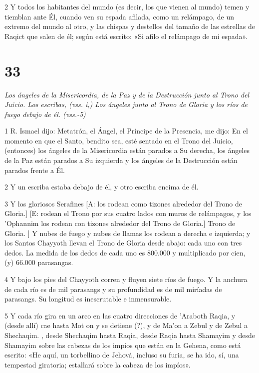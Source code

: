 \par 2 Y todos los habitantes del mundo (es decir, los que vienen al mundo) temen y tiemblan ante Él, cuando ven su espada afilada, como un relámpago, de un extremo del mundo al otro, y las chispas y destellos del tamaño de las estrellas de Raqict que salen de él; según está escrito: «Si afilo el relámpago de mi espada».


\chapter{33}

\par \textit{Los ángeles de la Misericordia, de la Paz y de la Destrucción junto al Trono del Juicio. Los escribas, (vss. i,) Los ángeles junto al Trono de Gloria y los ríos de fuego debajo de él. (vss.-5)}

\par 1 R. Ismael dijo: Metatrón, el Ángel, el Príncipe de la Presencia, me dijo: En el momento en que el Santo, bendito sea, esté sentado en el Trono del Juicio, (entonces) los ángeles de la Misericordia están parados a Su derecha, los ángeles de la Paz están parados a Su izquierda y los ángeles de la Destrucción están parados frente a Él.

\par 2 Y un escriba estaba debajo de él, y otro escriba encima de él.

\par 3 Y los gloriosos Serafines [A: los rodean como tizones alrededor del Trono de Gloria.] [E: rodean el Trono por sus cuatro lados con muros de relámpagos, y los 'Ophannim los rodean con tizones alrededor del Trono de Gloria.] Trono de Gloria. ] Y nubes de fuego y nubes de llamas los rodean a derecha e izquierda; y los Santos Chayyoth llevan el Trono de Gloria desde abajo: cada uno con tres dedos. La medida de los dedos de cada uno es 800.000 y multiplicado por cien, (y) 66.000 parasangas.

\par 4 Y bajo los pies del Chayyoth corren y fluyen siete ríos de fuego. Y la anchura de cada río es de mil parasangs y su profundidad es de mil miríadas de parasangs. Su longitud es inescrutable e inmensurable.

\par 5 Y cada río gira en un arco en las cuatro direcciones de 'Araboth Raqia, y (desde allí) cae hasta Mot on y se detiene (?), y de Ma'on a Zebul y de Zebul a Shechaqim. , desde Shechaqim hasta Raqia, desde Raqia hasta Shamayim y desde Shamayim sobre las cabezas de los impíos que están en la Gehena, como está escrito: «He aquí, un torbellino de Jehová, incluso su furia, se ha ido, sí, una tempestad giratoria; estallará sobre la cabeza de los impíos».

